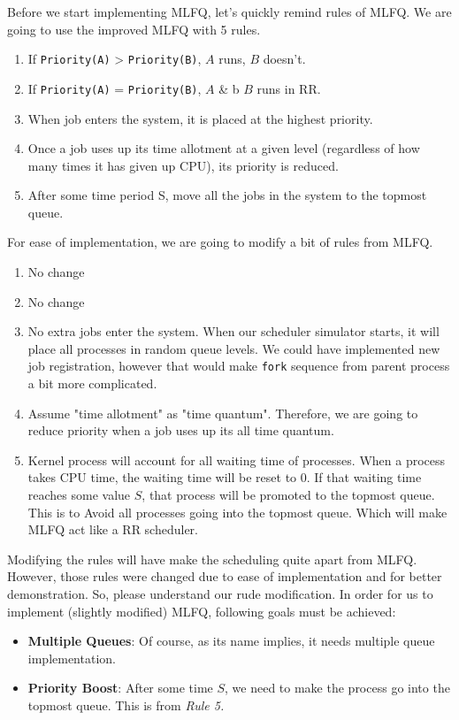 \documentclass{homework}
\begin{document}
Before we start implementing MLFQ, let's quickly remind rules of MLFQ. We are going to use the improved MLFQ with 5 rules.
\begin{enumerate}
    \item If \texttt{Priority(A)} > \texttt{Priority(B)}, $A$ runs, $B$ doesn't.
    \item If \texttt{Priority(A)} = \texttt{Priority(B)}, $A$ \& b $B$ runs in RR.
    \item When job enters the system, it is placed at the highest priority.
    \item Once a job uses up its time allotment at a given level (regardless of how many times it has given up CPU), its priority is reduced.
    \item After some time period S, move all the jobs in the system to the topmost queue.
\end{enumerate}
For ease of implementation, we are going to modify a bit of rules from MLFQ.
\begin{enumerate}
    \item No change
    \item No change
    \item No extra jobs enter the system. When our scheduler simulator starts, it will place all processes in random queue levels. We could have implemented new job registration, however that would make \texttt{fork} sequence from parent process a bit more complicated.
    \item Assume "time allotment" as "time quantum". Therefore, we are going to reduce priority when a job uses up its all time quantum.
    \item Kernel process will account for all waiting time of processes. When a process takes CPU time, the waiting time will be reset to 0. If that waiting time reaches some value $S$, that process will be promoted to the topmost queue. This is to Avoid all processes going into the topmost queue. Which will make MLFQ act like a RR scheduler.
\end{enumerate}
Modifying the rules will have make the scheduling quite apart from MLFQ. However, those rules were changed due to ease of implementation and for better demonstration. So, please understand our rude modification.
\pagebreak
In order for us to implement (slightly modified) MLFQ, following goals must be achieved:
\begin{itemize}
    \item \textbf{Multiple Queues}: Of course, as its name implies, it needs multiple queue implementation.
    \item \textbf{Priority Boost}: After some time $S$, we need to make the process go into the topmost queue. This is from \textit{Rule 5.}
\end{itemize}
\end{document}
